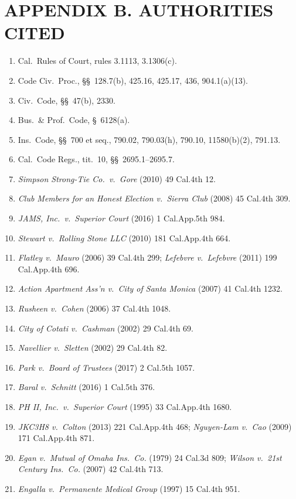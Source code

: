\section*{APPENDIX B. AUTHORITIES CITED}

\begin{enumerate}
\tightlist
\item Cal.\ Rules of Court, rules 3.1113, 3.1306(c).
\item Code Civ.\ Proc., \S\S~128.7(b), 425.16, 425.17, 436, 904.1(a)(13).
\item Civ.\ Code, \S\S~47(b), 2330.
\item Bus.\ \& Prof.\ Code, \S~6128(a).
\item Ins.\ Code, \S\S~700 et seq., 790.02, 790.03(h), 790.10, 11580(b)(2), 791.13.
\item Cal.\ Code Regs., tit.\ 10, \S\S~2695.1--2695.7.
\item \textit{Simpson Strong-Tie Co.\ v.\ Gore} (2010) 49 Cal.4th 12.
\item \textit{Club Members for an Honest Election v.\ Sierra Club} (2008) 45 Cal.4th 309.
\item \textit{JAMS, Inc.\ v.\ Superior Court} (2016) 1 Cal.App.5th 984.
\item \textit{Stewart v.\ Rolling Stone LLC} (2010) 181 Cal.App.4th 664.
\item \textit{Flatley v.\ Mauro} (2006) 39 Cal.4th 299; \textit{Lefebvre v.\ Lefebvre} (2011) 199 Cal.App.4th 696.
\item \textit{Action Apartment Ass'n v.\ City of Santa Monica} (2007) 41 Cal.4th 1232.
\item \textit{Rusheen v.\ Cohen} (2006) 37 Cal.4th 1048.
\item \textit{City of Cotati v.\ Cashman} (2002) 29 Cal.4th 69.
\item \textit{Navellier v.\ Sletten} (2002) 29 Cal.4th 82.
\item \textit{Park v.\ Board of Trustees} (2017) 2 Cal.5th 1057.
\item \textit{Baral v.\ Schnitt} (2016) 1 Cal.5th 376.
\item \textit{PH II, Inc.\ v.\ Superior Court} (1995) 33 Cal.App.4th 1680.
\item \textit{JKC3H8 v.\ Colton} (2013) 221 Cal.App.4th 468; \textit{Nguyen-Lam v.\ Cao} (2009) 171 Cal.App.4th 871.
\item \textit{Egan v.\ Mutual of Omaha Ins.\ Co.} (1979) 24 Cal.3d 809; \textit{Wilson v.\ 21st Century Ins.\ Co.} (2007) 42 Cal.4th 713.
\item \textit{Engalla v.\ Permanente Medical Group} (1997) 15 Cal.4th 951.
\end{enumerate}



